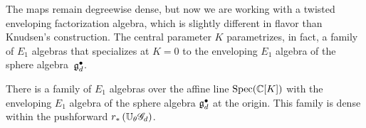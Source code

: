 The maps remain degreewise dense, but now we are working with a twisted enveloping factorization algebra,
which is slightly different in flavor than Knudsen's construction.
The central parameter $K$ parametrizes, in fact, a family of $E_1$ algebras that specializes at $K=0$ to the enveloping $E_1$ algebra of the sphere algebra~$\mathfrak g^\bullet_d$.

\begin{cor}
There is a family of $E_1$ algebras over the affine line ${\rm Spec}(\mathbb C[K])$ with the enveloping $E_1$ algebra of the sphere algebra $\mathfrak g^\bullet_d$ at the origin.
This family is dense within the pushforward $r_*\left(\mathbb U_\theta \mathscr G_d \right)$.
\end{cor}

